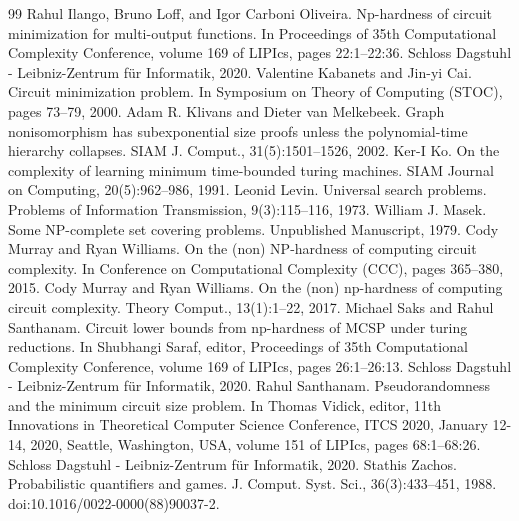 \documentclass[10pt,a4paper]{article}
\begin{document}
\begin{thebibliography}{99}
 Rahul Ilango, Bruno Loff, and Igor Carboni Oliveira. Np-hardness of circuit minimization for multi-output functions. In Proceedings of 35th Computational Complexity Conference, volume 169 of LIPIcs, pages 22:1–22:36. Schloss Dagstuhl - Leibniz-Zentrum für Informatik, 2020.
 Valentine Kabanets and Jin-yi Cai. Circuit minimization problem. In Symposium on Theory of Computing (STOC), pages 73–79, 2000.
 Adam R. Klivans and Dieter van Melkebeek. Graph nonisomorphism has subexponential size proofs unless the polynomial-time hierarchy collapses. SIAM J. Comput., 31(5):1501–1526, 2002.
 Ker-I Ko. On the complexity of learning minimum time-bounded turing machines. SIAM Journal on Computing, 20(5):962–986, 1991.
 Leonid Levin. Universal search problems. Problems of Information Transmission, 9(3):115–116, 1973.
 William J. Masek. Some NP-complete set covering problems. Unpublished Manuscript, 1979.
 Cody Murray and Ryan Williams. On the (non) NP-hardness of computing circuit complexity. In Conference on Computational Complexity (CCC), pages 365–380, 2015.
 Cody Murray and Ryan Williams. On the (non) np-hardness of computing circuit complexity. Theory Comput., 13(1):1–22, 2017.
 Michael Saks and Rahul Santhanam. Circuit lower bounds from np-hardness of MCSP under turing reductions. In Shubhangi Saraf, editor, Proceedings of 35th Computational Complexity Conference, volume 169 of LIPIcs, pages 26:1–26:13. Schloss Dagstuhl - Leibniz-Zentrum für Informatik, 2020.
 Rahul Santhanam. Pseudorandomness and the minimum circuit size problem. In Thomas Vidick, editor, 11th Innovations in Theoretical Computer Science Conference, ITCS 2020, January 12-14, 2020, Seattle, Washington, USA, volume 151 of LIPIcs, pages 68:1–68:26. Schloss Dagstuhl - Leibniz-Zentrum für Informatik, 2020.
 Stathis Zachos. Probabilistic quantifiers and games. J. Comput. Syst. Sci., 36(3):433–451, 1988. doi:10.1016/0022-0000(88)90037-2.
\end{thebibliography}
\end{document}
